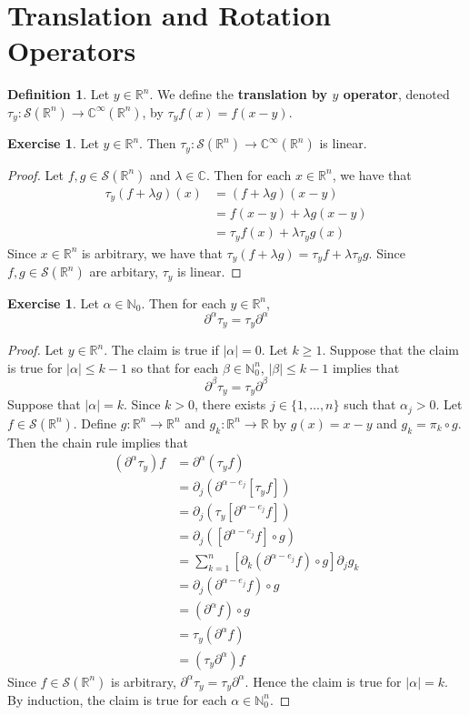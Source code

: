 \documentclass{book}
\theoremstyle{definition}
\newtheorem{defn}[definition]{Definition}
\newtheorem{ex}[definition]{Exercise}
\newcommand{\al}{\alpha}
\newcommand{\be}{\beta}
\newcommand{\lam}{\lambda}
\newcommand{\C}{\mathbb{C}}
\newcommand{\N}{\mathbb{N}}
\newcommand{\R}{\mathbb{R}}
\newcommand{\MS}{\mathcal{S}}
\DeclareMathOperator*{\0}{\mbf{0}}
\DeclareMathOperator*{\1}{\mbf{1}}
\newcommand{\p}{\partial}
\begin{document}
	
	\newpage
	\section{Translation and Rotation Operators}
	\begin{defn}
		Let $y \in \R^n$. We define the \textbf{translation by $y$ operator}, denoted $\tau_y: \MS(\R^n) \rightarrow \C^{\infty}(\R^n)$, by $\tau_yf(x) = f(x-y)$.
	\end{defn}

	\begin{ex}
		Let $y \in \R^n$. Then $\tau_y: \MS(\R^n) \rightarrow \C^{\infty}(\R^n)$ is linear.
	\end{ex}

	\begin{proof}
		 Let $f, g \in \MS(\R^n)$ and $\lam \in \C$. Then for each $x \in \R^n$, we have that
		\begin{align*}
			\tau_y(f + \lam g)(x) 
			& = (f+ \lam g)(x-y) \\
			& = f(x -y) + \lam g(x-y) \\
			& = \tau_y f (x) + \lam \tau_y g(x)
		\end{align*}
		Since $x \in \R^n$ is arbitrary, we have that $\tau_y (f + \lam g) = \tau_y f + \lam \tau_y g$. Since $f, g \in \MS(\R^n)$ are arbitary, $\tau_y$ is linear. 
	\end{proof}

	\begin{ex}
		Let $\al \in \N_0$.  Then for each $y \in \R^n$, 
		$$\p^{\al}\tau_y = \tau_y \p^{\al}$$
	\end{ex}

	\begin{proof}
		Let $y \in \R^n$. The claim is true if $|\al| = 0$. Let $k \geq 1$. Suppose that the claim is true for $|\al| \leq k-1$ so that for each $\be \in \N_0^n$, $|\be| \leq k-1$ implies that
		$$\p^{\be}\tau_y = \tau_y \p^{\be}$$ 
		Suppose that $|\al| = k$. Since $k >0$, there exists $j \in \{1, \ldots, n\}$ such that $\al_j >0$. Let $f \in \MS(\R^n)$. Define $g: \R^n \rightarrow \R^n$ and $g_k : \R^n \rightarrow \R$ by $g(x) = x-y$ and $g_k = \pi_k \circ g$. Then the chain rule implies that
		\begin{align*}
			(\p^{\al} \tau_y) f
			& = \p^{\al}( \tau_y f) \\
			& = \p_j (\p^{\al-e_j} [\tau_y f]) \\
			& = \p_j (\tau_y [\p^{\al-e_j} f]) \\
			& = \p_j ([\p^{\al-e_j} f] \circ g) \\
			& = \sum_{k=1}^n [\p_k(\p^{\al - e_j} f) \circ g]  \p_j g_k \\ 
			& = \p_j(\p^{\al - e_j} f) \circ g \\
			& = (\p^{\al} f) \circ g \\ 
			& = \tau_y ( \p^{\al} f) \\
			& = (\tau_y  \p^{\al}) f
		\end{align*}
		Since $f \in \MS(\R^n)$ is arbitrary, $\p^{\al} \tau_y = \tau_y  \p^{\al}$. Hence the claim is true for $|\al| = k$. By induction, the claim is true for each $\al \in \N_0^n$.
	\end{proof}
\end{document}
